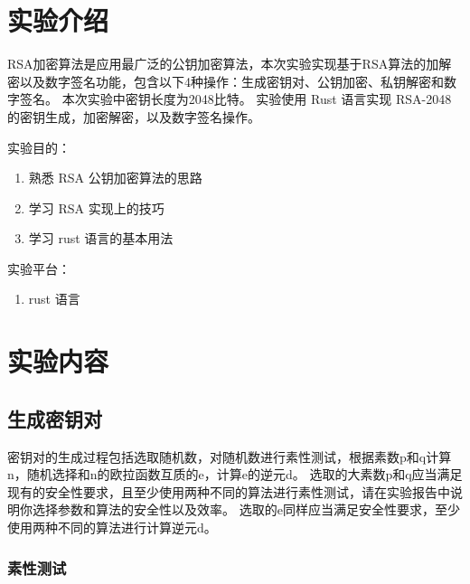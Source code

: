 \documentclass[degree=project,degree-type=project,cjk-font=noto]{thuthesis}
\begin{document}
\maketitle

\frontmatter
% 



\mainmatter

\chapter{实验介绍}
RSA加密算法是应用最广泛的公钥加密算法，本次实验实现基于RSA算法的加解密以及数字签名功能，包含以下4种操作：生成密钥对、公钥加密、私钥解密和数字签名。
本次实验中密钥长度为2048比特。
实验使用 Rust 语言实现 RSA-2048 的密钥生成，加密解密，以及数字签名操作。

实验目的：

\begin{enumerate}
    \item 熟悉 RSA 公钥加密算法的思路
    \item 学习 RSA 实现上的技巧
    \item 学习 rust 语言的基本用法
\end{enumerate}

实验平台：

\begin{enumerate}
    \item rust 语言
\end{enumerate}

\chapter{实验内容}

\section{生成密钥对}

密钥对的生成过程包括选取随机数，对随机数进行素性测试，根据素数p和q计算n，随机选择和n的欧拉函数互质的e，计算e的逆元d。
选取的大素数p和q应当满足现有的安全性要求，且至少使用两种不同的算法进行素性测试，请在实验报告中说明你选择参数和算法的安全性以及效率。
选取的e同样应当满足安全性要求，至少使用两种不同的算法进行计算逆元d。

\subsection{素性测试}
\end{document}
